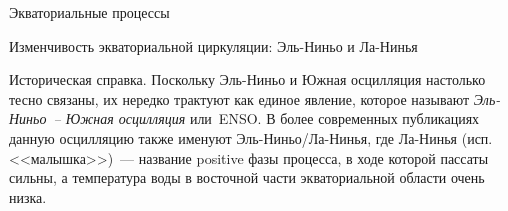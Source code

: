 \begin{chapter}{Экваториальные процессы}
\begin{section}{Изменчивость экваториальной циркуляции: Эль-Ниньо и Ла-Нинья}
\begin{paragraph}{Историческая справка.}
Поскольку Эль-Ниньо и Южная осцилляция настолько
тесно связаны, их нередко трактуют как единое явление, которое называют
\emph{Эль-Ниньо~-- Южная осцилляция}%
или~ENSO. 
В более современных публикациях данную осцилляцию также именуют
Эль-Ниньо/Ла-Нинья, где Ла-Нинья (исп. <<малышка>>)~--- название 
positive фазы процесса, в ходе которой пассаты сильны, а температура воды
в восточной части экваториальной области очень низка.
%
\end{paragraph}


\end{section}
\end{chapter}
